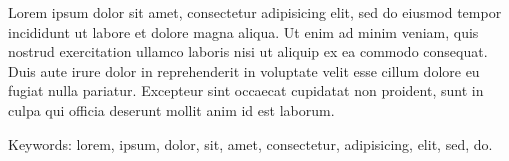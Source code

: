Lorem ipsum dolor sit amet, consectetur adipisicing elit, sed do eiusmod tempor incididunt ut labore et dolore magna aliqua. Ut enim ad minim veniam, quis nostrud exercitation ullamco laboris nisi ut aliquip ex ea commodo consequat. Duis aute irure dolor in reprehenderit in voluptate velit esse cillum dolore eu fugiat nulla pariatur. Excepteur sint occaecat cupidatat non proident, sunt in culpa qui officia deserunt mollit anim id est laborum.

\vfill
Keywords: lorem, ipsum, dolor, sit, amet, consectetur, adipisicing, elit, sed, do.

\newpage				%
\thispagestyle{empty}
\mbox{}
